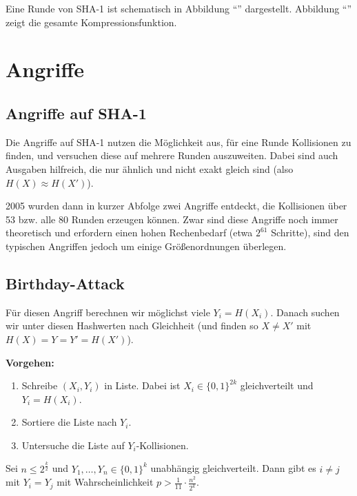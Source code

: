 Eine Runde von SHA-1 ist schematisch in Abbildung "`"' dargestellt. Abbildung "`"' zeigt die gesamte Kompressionsfunktion.

\section{Angriffe}

\subsection{Angriffe auf SHA-1}
Die Angriffe auf SHA-1 nutzen die Möglichkeit aus, für eine Runde Kollisionen zu finden, und versuchen diese auf mehrere Runden auszuweiten. Dabei sind auch
Ausgaben hilfreich, die nur ähnlich und nicht exakt gleich sind (also $H(X) \approx H(X')$).

2005 wurden dann in kurzer Abfolge zwei Angriffe entdeckt, die Kollisionen über 53 bzw. alle 80 Runden erzeugen können. Zwar sind diese Angriffe noch immer
theoretisch und erfordern einen hohen Rechenbedarf (etwa $2^{61}$ Schritte), sind den typischen Angriffen jedoch um einige Größenordnungen überlegen.

\subsection{Birthday-Attack}
Für diesen Angriff berechnen wir möglichst viele $Y_i = H(X_i)$.
Danach suchen wir unter diesen Hashwerten nach Gleichheit (und finden so $X \not = X'$ mit $H(X) = Y = Y' = H(X')$).
\vspace{10pt}

\textbf{Vorgehen:}
\begin{enumerate}
  \item Schreibe $(X_i, Y_i)$ in Liste. Dabei ist $X_i \in \{0,1\}^{2k}$ gleichverteilt und $Y_i = H(X_i)$.
  \item Sortiere die Liste nach $Y_i$.
  \item Untersuche die Liste auf $Y_i$-Kollisionen.
\end{enumerate}
\vspace{10pt}

\begin{theorem}
Sei $n \leq 2^{\frac{k}{2}}$ und $Y_1, \ldots , Y_n \in \{0,1\}^k$ unabhängig gleichverteilt. Dann gibt es $i \not = j$ mit $Y_i = Y_j$ mit Wahrscheinlichkeit
$p > \frac{1}{11} \cdot \frac{n^2}{2^k}$.
\end{theorem}
\vspace{10pt}

